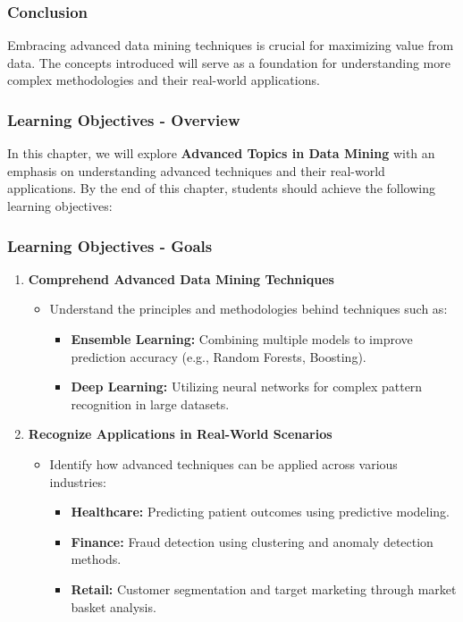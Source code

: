 \documentclass{beamer}
\begin{document}
\begin{frame}[fragile]
    \frametitle{Conclusion}
    Embracing advanced data mining techniques is crucial for maximizing value from data. The concepts introduced will serve as a foundation for understanding more complex methodologies and their real-world applications.
\end{frame}

\begin{frame}[fragile]
    \frametitle{Learning Objectives - Overview}
    In this chapter, we will explore \textbf{Advanced Topics in Data Mining} with an emphasis on understanding advanced techniques and their real-world applications. By the end of this chapter, students should achieve the following learning objectives:
\end{frame}

\begin{frame}[fragile]
    \frametitle{Learning Objectives - Goals}
    \begin{enumerate}
        \item \textbf{Comprehend Advanced Data Mining Techniques}
            \begin{itemize}
                \item Understand the principles and methodologies behind techniques such as:
                    \begin{itemize}
                        \item \textbf{Ensemble Learning:} Combining multiple models to improve prediction accuracy (e.g., Random Forests, Boosting).
                        \item \textbf{Deep Learning:} Utilizing neural networks for complex pattern recognition in large datasets.
                    \end{itemize}
            \end{itemize}
        \item \textbf{Recognize Applications in Real-World Scenarios}
            \begin{itemize}
                \item Identify how advanced techniques can be applied across various industries:
                    \begin{itemize}
                        \item \textbf{Healthcare:} Predicting patient outcomes using predictive modeling.
                        \item \textbf{Finance:} Fraud detection using clustering and anomaly detection methods.
                        \item \textbf{Retail:} Customer segmentation and target marketing through market basket analysis.
                    \end{itemize}
            \end{itemize}
    \end{enumerate}
\end{frame}
\end{document}
